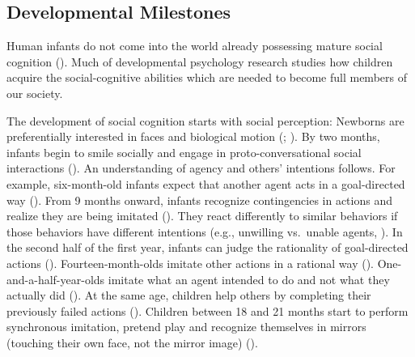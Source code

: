 \documentclass[
]{scrbook}
\begin{document}
\subsection{Developmental Milestones}\label{developmental-milestones}

Human infants do not come into the world already possessing mature social cognition (). Much of developmental psychology research studies how children acquire the social-cognitive abilities which are needed to become full members of our society.

The development of social cognition starts with social perception: Newborns are preferentially interested in faces and biological motion (; ). By two months, infants begin to smile socially and engage in proto-conversational social interactions (). An understanding of agency and others' intentions follows. For example, six-month-old infants expect that another agent acts in a goal-directed way (). From 9 months onward, infants recognize contingencies in actions and realize they are being imitated (). They react differently to similar behaviors if those behaviors have different intentions (e.g., unwilling vs.~unable agents, ). In the second half of the first year, infants can judge the rationality of goal-directed actions (). Fourteen-month-olds imitate other actions in a rational way (). One-and-a-half-year-olds imitate what an agent intended to do and not what they actually did (). At the same age, children help others by completing their previously failed actions (). Children between 18 and 21 months start to perform synchronous imitation, pretend play and recognize themselves in mirrors (touching their own face, not the mirror image) ().
\end{document}
